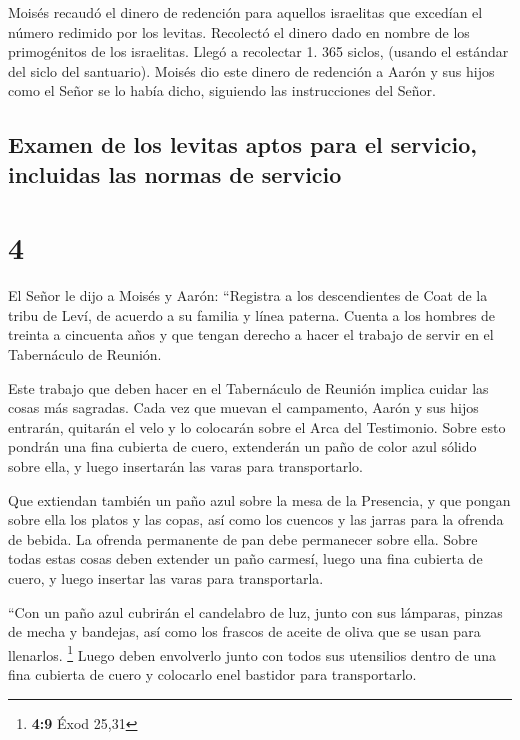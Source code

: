  Moisés recaudó el dinero de redención para aquellos
israelitas que excedían el número redimido por los levitas.
 Recolectó el dinero dado en nombre de los primogénitos
de los israelitas. Llegó a recolectar 1. 365 siclos, (usando el estándar
del siclo del santuario).  Moisés dio este dinero de
redención a Aarón y sus hijos como el Señor se lo había dicho, siguiendo
las instrucciones del Señor.

\hypertarget{examen-de-los-levitas-aptos-para-el-servicio-incluidas-las-normas-de-servicio}{%
\subsection{Examen de los levitas aptos para el servicio, incluidas las
normas de
servicio}\label{examen-de-los-levitas-aptos-para-el-servicio-incluidas-las-normas-de-servicio}}

\hypertarget{section-3}{%
\section{4}\label{section-3}}

 El Señor le dijo a Moisés y Aarón: 
``Registra a los descendientes de Coat de la tribu de Leví, de acuerdo a
su familia y línea paterna.  Cuenta a los hombres de
treinta a cincuenta años y que tengan derecho a hacer el trabajo de
servir en el Tabernáculo de Reunión.

 Este trabajo que deben hacer en el Tabernáculo de Reunión
implica cuidar las cosas más sagradas.  Cada vez que
muevan el campamento, Aarón y sus hijos entrarán, quitarán el velo y lo
colocarán sobre el Arca del Testimonio.  Sobre esto
pondrán una fina cubierta de cuero, extenderán un paño de color azul
sólido sobre ella, y luego insertarán las varas para transportarlo.

 Que extiendan también un paño azul sobre la mesa de la
Presencia, y que pongan sobre ella los platos y las copas, así como los
cuencos y las jarras para la ofrenda de bebida. La ofrenda permanente de
pan debe permanecer sobre ella.  Sobre todas estas cosas
deben extender un paño carmesí, luego una fina cubierta de cuero, y
luego insertar las varas para transportarla.

 ``Con un paño azul cubrirán el candelabro de luz, junto
con sus lámparas, pinzas de mecha y bandejas, así como los frascos de
aceite de oliva que se usan para llenarlos. \footnote{\textbf{4:9} Éxod
  25,31}  Luego deben envolverlo junto con todos sus
utensilios dentro de una fina cubierta de cuero y colocarlo enel
bastidor para transportarlo.

